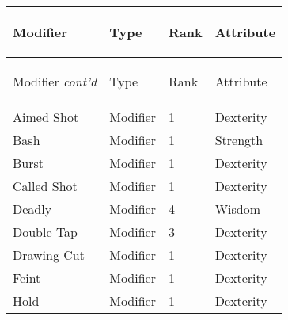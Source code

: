 \documentclass[twoside]{book}
\begin{document}
\begin{longtable}{p{1.25in}lll} 
  Modifier
  &
  \begin{turn}{70}{Type}\end{turn}
          
  &
  \begin{turn}{70}{Rank}\end{turn}
          
  &
  \begin{turn}{70}{Attribute}\end{turn}
          
  \\
  \hline
  \hline
  \endfirsthead
  Modifier \textit{cont'd}
        
  &
  \begin{turn}{70}{Type}\end{turn}
          
  &
  \begin{turn}{70}{Rank}\end{turn}
          
  &
  \begin{turn}{70}{Attribute}\end{turn}
          
  \\
  \hline
  \endhead
      
  \raggedright
           Aimed Shot 
  &
   Modifier 
  &
   1 
  &
   Dexterity 
  \tabularnewline
      
  \raggedright
           Bash 
  &
   Modifier 
  &
   1 
  &
   Strength 
  \tabularnewline
      
  \raggedright
           Burst 
  &
   Modifier 
  &
   1 
  &
   Dexterity 
  \tabularnewline
      
  \raggedright
           Called Shot 
  &
   Modifier 
  &
   1 
  &
   Dexterity 
  \tabularnewline
      
  \raggedright
           Deadly 
  &
   Modifier 
  &
   4 
  &
   Wisdom 
  \tabularnewline
      
  \raggedright
           Double Tap 
  &
   Modifier 
  &
   3 
  &
   Dexterity 
  \tabularnewline
      
  \raggedright
           Drawing Cut 
  &
   Modifier 
  &
   1 
  &
   Dexterity 
  \tabularnewline
      
  \raggedright
           Feint 
  &
   Modifier 
  &
   1 
  &
   Dexterity 
  \tabularnewline
      
  \raggedright
           Hold 
  &
   Modifier 
  &
   1 
  &
   Dexterity 
  \tabularnewline
      

\end{longtable}
\end{document}
